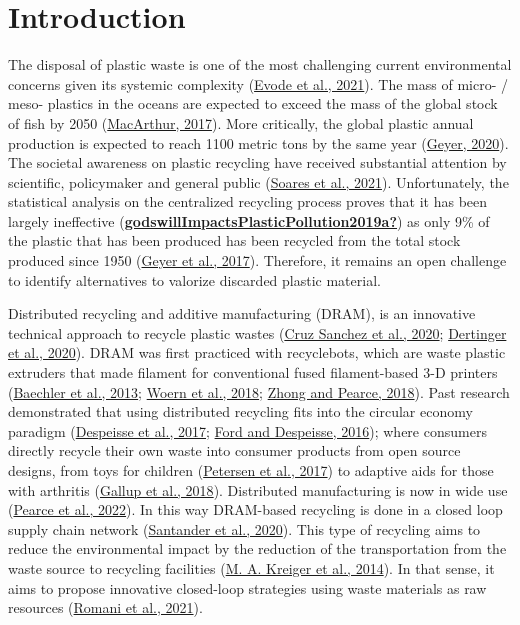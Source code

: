 \documentclass[
  12pt,
  number,
  review]{elsarticle}
\begin{document}
\hypertarget{introduction}{%
\section{Introduction}\label{introduction}}

The disposal of plastic waste is one of the most challenging current
environmental concerns given its systemic complexity
(\protect\hyperlink{ref-evode2021}{Evode et al., 2021}). The mass of
micro- / meso- plastics in the oceans are expected to exceed the mass of
the global stock of fish by 2050
(\protect\hyperlink{ref-macarthur2017}{MacArthur, 2017}). More
critically, the global plastic annual production is expected to reach
1100 metric tons by the same year
(\protect\hyperlink{ref-geyer2020}{Geyer, 2020}). The societal awareness
on plastic recycling have received substantial attention by scientific,
policymaker and general public
(\protect\hyperlink{ref-soares2021}{Soares et al., 2021}).
Unfortunately, the statistical analysis on the centralized recycling
process proves that it has been largely ineffective
(\protect\hyperlink{ref-godswillImpactsPlasticPollution2019a}{\textbf{godswillImpactsPlasticPollution2019a?}})
as only 9\% of the plastic that has been produced has been recycled from
the total stock produced since 1950
(\protect\hyperlink{ref-Geyer2017}{Geyer et al., 2017}). Therefore, it
remains an open challenge to identify alternatives to valorize discarded
plastic material.

Distributed recycling and additive manufacturing (DRAM), is an
innovative technical approach to recycle plastic wastes
(\protect\hyperlink{ref-cruzsanchez2020}{Cruz Sanchez et al., 2020};
\protect\hyperlink{ref-dertinger2020}{Dertinger et al., 2020}). DRAM was
first practiced with recyclebots, which are waste plastic extruders that
made filament for conventional fused filament-based 3-D printers
(\protect\hyperlink{ref-baechler2013}{Baechler et al., 2013};
\protect\hyperlink{ref-woern2018}{Woern et al., 2018};
\protect\hyperlink{ref-zhong2018}{Zhong and Pearce, 2018}). Past
research demonstrated that using distributed recycling fits into the
circular economy paradigm
(\protect\hyperlink{ref-Despeisse2016}{Despeisse et al., 2017};
\protect\hyperlink{ref-Ford2016}{Ford and Despeisse, 2016}); where
consumers directly recycle their own waste into consumer products from
open source designs, from toys for children
(\protect\hyperlink{ref-Petersen2017}{Petersen et al., 2017}) to
adaptive aids for those with arthritis
(\protect\hyperlink{ref-gallup2018}{Gallup et al., 2018}). Distributed
manufacturing is now in wide use
(\protect\hyperlink{ref-pearce2022}{Pearce et al., 2022}). In this way
DRAM-based recycling is done in a closed loop supply chain network
(\protect\hyperlink{ref-santander2020}{Santander et al., 2020}). This
type of recycling aims to reduce the environmental impact by the
reduction of the transportation from the waste source to recycling
facilities (\protect\hyperlink{ref-kreiger2014}{M. A. Kreiger et al.,
2014}). In that sense, it aims to propose innovative closed-loop
strategies using waste materials as raw resources
(\protect\hyperlink{ref-romani2021}{Romani et al., 2021}).
\end{document}
